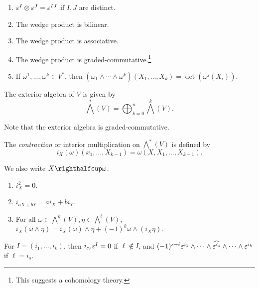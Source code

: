 \documentclass[twoside, 10pt]{article}
\begin{document}
    \begin{prop}
        \begin{enumerate}
            \item $\varepsilon^I \otimes \varepsilon^J = \varepsilon^{IJ}$ if $I,J$ are distinct.
            \item The wedge product is bilinear.
            \item The wedge product is associative.
            \item The wedge product is graded-commutative.\footnote{This suggests a cohomology theory.}
            \item If $\omega^1, \ldots, \omega^k \in V^*$, then $(\omega_1 \wedge \cdots \wedge \omega^k)(X_1, \ldots, X_k) = \det(\omega^j(X_i))$.
        \end{enumerate}
    \end{prop}

    \begin{defn}
        The exterior algebra of $V$ is given by
        \[ \bigwedge^*(V) = \bigoplus_{k=0}^n \bigwedge^k(V).\]
    \end{defn}
    Note that the exterior algebra is graded-commutative.

    \begin{defn}
        The \textit{contraction} or interior multiplication on $\bigwedge^*(V)$ is defined by
        \[ i_X(\omega)(x_1, \ldots, X_{k-1}) = \omega(X,X_1, \ldots, X_{k-1}). \]
    \end{defn}

    We also write $X \righthalfcup \omega$.

    \begin{lem}
        \begin{enumerate}
            \item $i_X^2 = 0$.
            \item $i_{aX+bY} = ai_X + bi_Y$.
            \item For all $\omega \in \bigwedge^k(V), \eta \in \bigwedge^{\ell}(V)$, $i_X(\omega \wedge \eta) = i_X(\omega) \wedge \eta + (-1)^{k} \omega \wedge (i_X \eta)$.
        \end{enumerate}
    \end{lem}

    \begin{exm}
        For $I = (i_1, \ldots, i_k)$, then $i_{e_\ell} \varepsilon^I = 0$ if $\ell \notin I$, and $(-1)^{s+\ell} \varepsilon^{i_1} \wedge \cdots \wedge \widehat{\varepsilon^{i_s}} \wedge \cdots \wedge \varepsilon^{i_k}$ if $\ell = i_s$.
    \end{exm}
\end{document}
